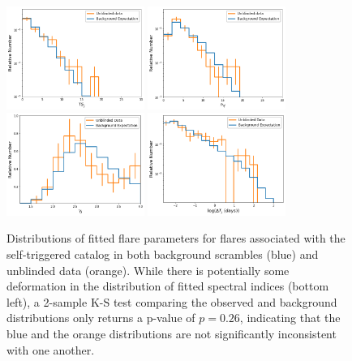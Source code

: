 \begin{figure}[h]
\centering
\includegraphics[width=0.4\textwidth]{figs/st_tsjdist.png}
\includegraphics[width=0.4\textwidth]{figs/st_nsdist.png}
\includegraphics[width=0.4\textwidth]{figs/st_gammadist.png}
\includegraphics[width=0.4\textwidth]{figs/st_dtdist.png}
\caption{Distributions of fitted flare parameters for flares associated with the self-triggered catalog in both background scrambles (blue) and unblinded data (orange). While there is potentially some deformation in the distribution of fitted spectral indices (bottom left), a 2-sample K-S test comparing the observed and background distributions only returns a p-value of $p=0.26$, indicating that the blue and the orange distributions are not significantly inconsistent with one another. }
\label{fig:stresults}
\end{figure}

